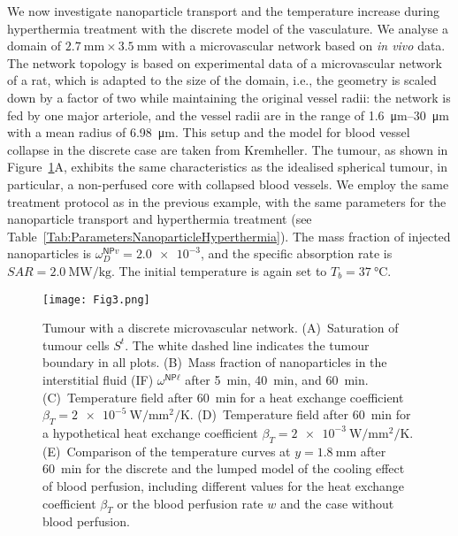 \documentclass[Times1COL,AMA]{WileyNJDv5} %
\newcommand{\omegaNPl}{\omega^{\textsf{NP}\ell}}
\newcommand{\omegaNPvD}{\omega^{\textsf{NP}v}_D}
\begin{document}
We now investigate nanoparticle transport and the temperature increase during hyperthermia treatment with the discrete model of the vasculature.
We analyse a domain of $\SI{2.7}{\milli\meter}\times \SI{3.5}{\milli\meter}$ with a microvascular network based on \textit{in vivo} data.
The network topology is based on experimental data \cite{Pries1990,Walker-Samuel2017} of a microvascular network of a rat, which is adapted to the size of the domain, i.e., the geometry is scaled down by a factor of two while maintaining the original vessel radii:
the network is fed by one major arteriole, and the vessel radii are in the range of \SIrange{1.6}{30}{\micro\meter} with a mean radius of \SI{6.98}{\micro\meter}.
This setup and the model for blood vessel collapse in the discrete case are taken from Kremheller. \cite[pp157--162]{Kremheller2021Thesis}
The tumour, as shown in Figure~\ref{fig:WithArteries}A, exhibits the same characteristics as the idealised spherical tumour, in particular, a non-perfused core with collapsed blood vessels.
We employ the same treatment protocol as in the previous example, with the same parameters for the nanoparticle transport and hyperthermia treatment (see Table~\ref{Tab:ParametersNanoparticleHyperthermia}).
The mass fraction of injected nanoparticles is $\omegaNPvD = \num{2.0e-3}$, and the specific absorption rate is $SAR = \SI{2.0}{\mega\watt\per\kilo\gram}$.
The initial temperature is again set to $T_{b} = \SI{37}{\celsius}$.

\begin{figure}[btp]
    \centering
    \texttt{[image: Fig3.png]}
    \caption{Tumour with a discrete microvascular network.
        (A)~Saturation of tumour cells $S^t$.
        The white dashed line indicates the tumour boundary in all plots.
        (B)~Mass fraction of nanoparticles in the interstitial fluid (IF) $\omegaNPl$ after \SI{5}{\minute}, \SI{40}{\minute}, and \SI{60}{\minute}.
        (C)~Temperature field after \SI{60}{\minute} for a heat exchange coefficient $\beta_T = \SI{2e-5}{\watt\per\milli\meter\squared\per\kelvin}$.
        (D)~Temperature field after \SI{60}{\minute} for a hypothetical heat exchange coefficient $\beta_T = \SI{2e-3}{\watt\per\milli\meter\squared\per\kelvin}$.
        (E)~Comparison of the temperature curves at $y = \SI{1.8}{\milli\meter}$ after \SI{60}{\minute} for the discrete and the lumped model of the cooling effect of blood perfusion, including different values for the heat exchange coefficient $\beta_T$ or the blood perfusion rate $w$ and the case without blood perfusion.
    }
    \label{fig:WithArteries}
\end{figure}
\end{document}
